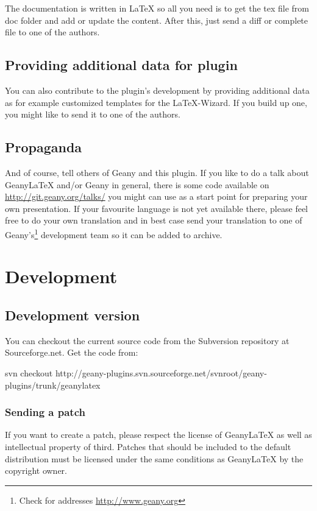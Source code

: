 \documentclass[%
paper=a4,%
fontsize=11pt,%
twoside=false,%
DIV18,%
headsepline,%
plainheadsepline,%
footsepline,%
plainfootsepline,%
bibliography=totoc,%
listof=totoc,%
BCOR10mm,%
parskip=half,%
openany,%
]{scrartcl}
\begin{document}
The documentation is written in \LaTeX{} so all you need is to get the
tex file from doc folder and add or update the content.
After this, just send a diff or complete file to one of the authors.


\subsection{Providing additional data for plugin}

You can also contribute to the plugin's development by providing
additional data as for example customized templates for the
\LaTeX-Wizard. If you build up one, you might like to send it to
one of the authors.

\subsection{Propaganda}
And of course, tell others of Geany and this plugin. If you like to do
a talk about Geany\LaTeX{} and/or Geany in general, there is some code
available on \url{http://git.geany.org/talks/} you might can use as a
start point for preparing your own presentation. If your favourite
language is not yet available there, please feel free to do your own
translation and in best case send your translation to one of
Geany's\footnote{Check for addresses \url{http://www.geany.org}}
development team so it can be added to archive.


\section{Development}
\subsection{Development version}
You can checkout the current source code from the Subversion repository
at Sourceforge.net. Get the code from:

svn checkout
http://geany-plugins.svn.sourceforge.net/svnroot/geany-plugins/trunk/geanylatex

\subsubsection{Sending a patch}
\label{sec:sending_a_patch}
If you want to create a patch, please respect the license of
Geany\LaTeX{} as well as intellectual property of third. Patches that
should be included to the default distribution must be licensed under
the same conditions as Geany\LaTeX{} by the copyright owner.
\end{document}
